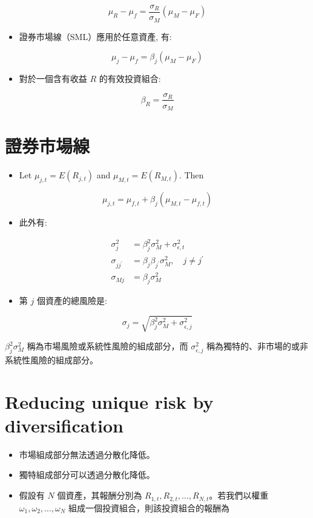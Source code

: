 \documentclass[letterpaper]{article}
\begin{document}
$$
\mu_{R}-\mu_{f}=\frac{\sigma_{R}}{\sigma_{M}}\left(\mu_{M}-\mu_{F}\right)
$$

\begin{itemize}
  \item  證券市場線（SML）應用於任意資產, 有:
\end{itemize}

$$
\mu_{j}-\mu_{f}=\beta_{j}\left(\mu_{M}-\mu_{F}\right)
$$

\begin{itemize}
  \item 對於一個含有收益 $R$ 的有效投資組合:
\end{itemize}

$$
\beta_{R}=\frac{\sigma_{R}}{\sigma_{M}}
$$

\section{證券市場線}
\begin{itemize}
  \item Let $\mu_{j, t}=E\left(R_{j, t}\right)$ and $\mu_{M, t}=E\left(R_{M, t}\right)$. Then
\end{itemize}

$$
\mu_{j, t}=\mu_{f, t}+\beta_{j}\left(\mu_{M, t}-\mu_{f, t}\right)
$$

\begin{itemize}
  \item 此外有:
\end{itemize}

$$
\begin{aligned}
\sigma_{j}^{2} & =\beta_{j}^{2} \sigma_{M}^{2}+\sigma_{\epsilon, t}^{2} \\
\sigma_{j j^{\prime}} & =\beta_{j} \beta_{j^{\prime}} \sigma_{M}^{2}, \quad j \neq j^{\prime} \\
\sigma_{M j} & =\beta_{j} \sigma_{M}^{2}
\end{aligned}
$$

\begin{itemize}
\item 第 \( j \) 個資產的總風險是:
\end{itemize}

$$
\sigma_{j}=\sqrt{\beta_{j}^{2} \sigma_{M}^{2}+\sigma_{\epsilon, j}^{2}}
$$

$\beta_{j}^{2} \sigma_{M}^{2}$ 稱為市場風險或系統性風險的組成部分，而 $\sigma_{\epsilon, j}^{2}$ 稱為獨特的、非市場的或非系統性風險的組成部分。


\section{Reducing unique risk by diversification}
\begin{itemize}
	\item 市場組成部分無法透過分散化降低。
	\item 獨特組成部分可以透過分散化降低。
	\item 假設有 $N$ 個資產，其報酬分別為 $R_{1, t}, R_{2, t}, \ldots, R_{N, t}$。若我們以權重 $\omega_{1}, \omega_{2}, \ldots, \omega_{N}$ 組成一個投資組合，則該投資組合的報酬為
\end{itemize}
\end{document}
